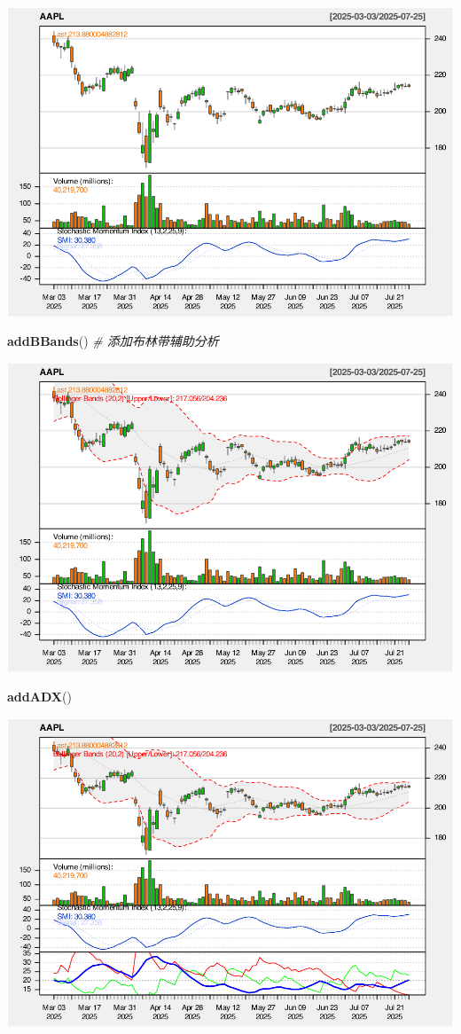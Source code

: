 \documentclass[]{ctexbook}
\newenvironment{Shaded}{\begin{snugshade}}{\end{snugshade}}
\newcommand{\CommentTok}[1]{\textcolor[rgb]{0.56,0.35,0.01}{\textit{#1}}}
\newcommand{\FunctionTok}[1]{\textcolor[rgb]{0.13,0.29,0.53}{\textbf{#1}}}
\newcommand{\NormalTok}[1]{#1}
\begin{document}
\includegraphics[width=0.9\linewidth]{QuantmodHandbook_files/figure-latex/smi_2-2}

\begin{Shaded}
\begin{Highlighting}[]
\FunctionTok{addBBands}\NormalTok{()  }\CommentTok{\# 添加布林带辅助分析}
\end{Highlighting}
\end{Shaded}

\includegraphics[width=0.9\linewidth]{QuantmodHandbook_files/figure-latex/smi_2-3}

\begin{Shaded}
\begin{Highlighting}[]
\FunctionTok{addADX}\NormalTok{()}
\end{Highlighting}
\end{Shaded}

\includegraphics[width=0.9\linewidth]{QuantmodHandbook_files/figure-latex/smi_2-4}
\end{document}
